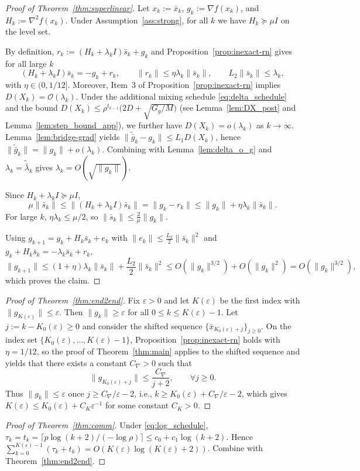 \documentclass[11pt,a4paper]{article}
\def\cO{O}%
\newcommand{\cO}{\mathcal{O}}
\begin{document}
\begin{proof}[Proof of Theorem~\ref{thm:superlinear}]
Let $x_k:=\bar x_k$, $g_k:=\nabla f(x_k)$, and $H_k:=\nabla^2 f(x_k)$.
Under Assumption~\ref{ass:strong}, for all $k$ we have $H_k\succeq \mu I$ on the level set.

By definition, $r_k:=(H_k+\lambda_k I)\bar s_k+g_k$ and Proposition~\ref{prop:inexact-rn} gives for all large $k$
\[
(H_k+\lambda_k I)\bar s_k=-g_k+r_k,\qquad \|r_k\|\le \eta\lambda_k\|\bar s_k\|,\qquad L_2\|\bar s_k\|\le \lambda_k,
\]
with $\eta\in(0,1/12]$. Moreover, Item~3 of Proposition~\ref{prop:inexact-rn} implies $D(X_k)=\mathcal O(\lambda_k)$.
Under the additional mixing schedule \eqref{eq:delta_schedule} and the bound
$D(X_k)\le \rho^{t_{k-1}}\big(2D+\sqrt{G_g/M}\big)$ (see Lemma~\ref{lem:DX_post} and Lemma~\ref{lem:step_bound_app}),
we further have $D(X_k)=o(\lambda_k)$ as $k\to\infty$.
Lemma~\ref{lem:bridge-grad} yields
$\|\tilde{\bar g}_k-g_k\|\le L_1D(X_k)$, hence $\|\tilde{\bar g}_k\|=\|g_k\|+o(\lambda_k)$.
Combining with Lemma~\ref{lem:delta_o_g} and $\lambda_k=\tilde{\bar\lambda}_k$ gives $\lambda_k=\cO(\sqrt{\|g_k\|})$.

Since $H_k+\lambda_k I\succeq \mu I$,
\[
\mu\|\bar s_k\|\le \|(H_k+\lambda_k I)\bar s_k\|=\|g_k-r_k\|\le \|g_k\|+\eta\lambda_k\|\bar s_k\|.
\]
For large $k$, $\eta\lambda_k\le \mu/2$, so $\|\bar s_k\|\le \frac{2}{\mu}\|g_k\|$.

Using $g_{k+1}=g_k+H_k\bar s_k+e_k$ with $\|e_k\|\le \frac{L_2}{2}\|\bar s_k\|^2$ and $g_k+H_k\bar s_k=-\lambda_k\bar s_k+r_k$,
\[
\|g_{k+1}\|\le (1+\eta)\lambda_k\|\bar s_k\|+\frac{L_2}{2}\|\bar s_k\|^2
\le \cO(\|g_k\|^{3/2})+\cO(\|g_k\|^2)=\cO(\|g_k\|^{3/2}),
\]
which proves the claim.
\end{proof}



\begin{proof}[Proof of Theorem~\ref{thm:end2end}]
Fix $\varepsilon>0$ and let $K(\varepsilon)$ be the first index with $\|g_{K(\varepsilon)}\|\le \varepsilon$.
Then $\|g_k\|\ge \varepsilon$ for all $0\le k\le K(\varepsilon)-1$.
Let $j:=k-K_0(\varepsilon)\ge 0$ and consider the shifted sequence $\{\bar x_{K_0(\varepsilon)+j}\}_{j\ge 0}$.
On the index set $\{K_0(\varepsilon),\dots,K(\varepsilon)-1\}$, Proposition~\ref{prop:inexact-rn} holds with $\eta=1/12$,
so the proof of Theorem~\ref{thm:main} applies to the shifted sequence and yields that there exists a constant
$C_{\nabla}>0$ such that
\[
\|g_{K_0(\varepsilon)+j}\|\le \frac{C_{\nabla}}{j+2},\qquad \forall j\ge 0.
\]
Thus $\|g_k\|\le \varepsilon$ once $j\ge C_{\nabla}/\varepsilon-2$, i.e., $k\ge K_0(\varepsilon)+C_{\nabla}/\varepsilon-2$,
which gives $K(\varepsilon)\le K_0(\varepsilon)+C_K\varepsilon^{-1}$ for some constant $C_K>0$.
\end{proof}

\begin{proof}[Proof of Theorem~\ref{thm:comm}]
Under \eqref{eq:log_schedule}, $\tau_k=t_k=\lceil p\log(k+2)/(-\log\rho)\rceil\le c_0+c_1\log(k+2)$.
Hence $\sum_{k=0}^{K(\varepsilon)-1}(\tau_k+t_k)=\cO(K(\varepsilon)\log(K(\varepsilon)+2))$.
Combine with Theorem~\ref{thm:end2end}.
\end{proof}
\end{document}
